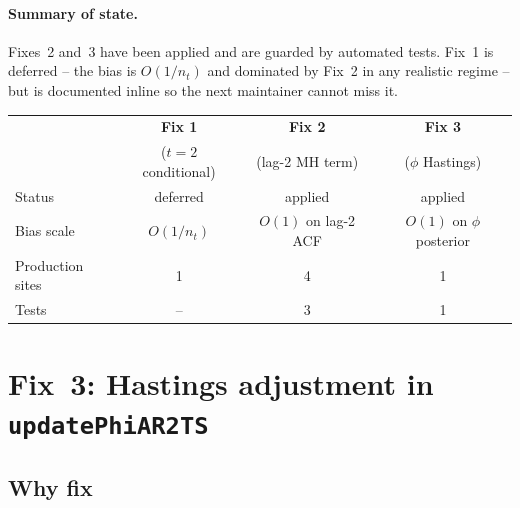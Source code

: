 \documentclass[11pt]{article}
\begin{document}
\paragraph{Summary of state.} Fixes~2 and~3 have been applied and are guarded
by automated tests. Fix~1 is deferred -- the bias is $O(1/n_t)$ and dominated
by Fix~2 in any realistic regime -- but is documented inline so the next
maintainer cannot miss it.
\begin{center}
\begin{tabular}{lccc}
\toprule
                          & \textbf{Fix 1}            & \textbf{Fix 2}                      & \textbf{Fix 3}                        \\
                          & ($t = 2$ conditional)     & (lag-2 MH term)                     & ($\phi$ Hastings)                     \\
\midrule
Status                    & deferred                  & applied                             & applied                               \\
Bias scale                & $O(1/n_t)$                & $O(1)$ on lag-2 ACF                 & $O(1)$ on $\phi$ posterior            \\
Production sites          & 1                         & 4                                   & 1                                     \\
Tests                     & --                        & 3                                   & 1                                     \\
\bottomrule
\end{tabular}
\end{center}

\section{Fix~3: Hastings adjustment in \texttt{updatePhiAR2TS}}\label{ar2fix:fix3}

\subsection{Why fix}
\end{document}
